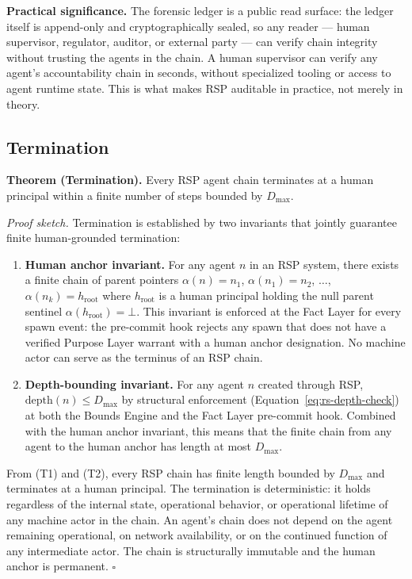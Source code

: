 \textbf{Practical significance.} The forensic ledger is a public read surface: the ledger itself is append-only and cryptographically sealed, so any reader — human supervisor, regulator, auditor, or external party — can verify chain integrity without trusting the agents in the chain. A human supervisor can verify any agent's accountability chain in seconds, without specialized tooling or access to agent runtime state. This is what makes RSP auditable in practice, not merely in theory.

\subsection{Termination}
\label{sec:rs-termination}

\textbf{Theorem (Termination).} Every RSP agent chain terminates at a human principal within a finite number of steps bounded by $D_{\max}$.

\medskip
\noindent\textit{Proof sketch.} Termination is established by two invariants that jointly guarantee finite human-grounded termination:

\begin{enumerate}
    \item[(T1)]\textbf{Human anchor invariant.} For any agent $n$ in an RSP system, there exists a finite chain of parent pointers $\alpha(n) = n_1$, $\alpha(n_1) = n_2$, $\dots$, $\alpha(n_k) = h_{\text{root}}$ where $h_{\text{root}}$ is a human principal holding the null parent sentinel $\alpha(h_{\text{root}}) = \bot$. This invariant is enforced at the Fact Layer for every spawn event: the pre-commit hook rejects any spawn that does not have a verified Purpose Layer warrant with a human anchor designation. No machine actor can serve as the terminus of an RSP chain.

    \item[(T2)]\textbf{Depth-bounding invariant.} For any agent $n$ created through RSP, $\text{depth}(n) \leq D_{\max}$ by structural enforcement (Equation~\ref{eq:rs-depth-check}) at both the Bounds Engine and the Fact Layer pre-commit hook. Combined with the human anchor invariant, this means that the finite chain from any agent to the human anchor has length at most $D_{\max}$.
\end{enumerate}

From (T1) and (T2), every RSP chain has finite length bounded by $D_{\max}$ and terminates at a human principal. The termination is deterministic: it holds regardless of the internal state, operational behavior, or operational lifetime of any machine actor in the chain. An agent's chain does not depend on the agent remaining operational, on network availability, or on the continued function of any intermediate actor. The chain is structurally immutable and the human anchor is permanent. $\square$


